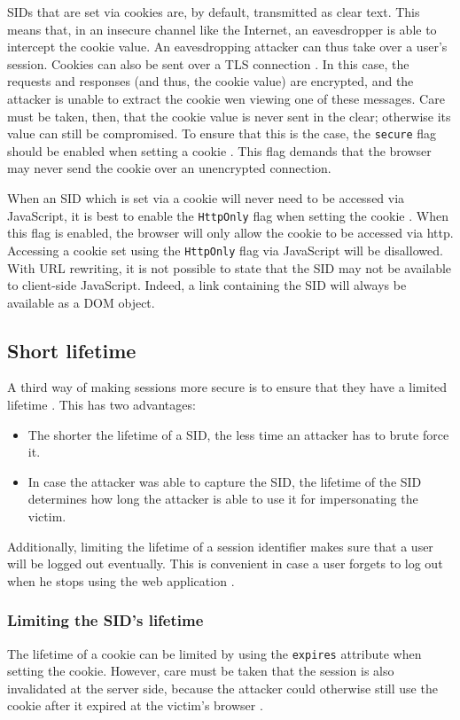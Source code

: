 \label{secure-flag}SIDs that are set via cookies are, by default, transmitted as clear text. This means that, in an insecure channel like the Internet, an eavesdropper is able to intercept the cookie value. An eavesdropping attacker can thus take over a user's session. Cookies can also be sent over a TLS connection \cite{rfc2246}. In this case, the requests and responses (and thus, the cookie value) are encrypted, and the attacker is unable to extract the cookie wen viewing one of these messages. Care must be taken, then, that the cookie value is never sent in the clear; otherwise its value can still be compromised. To ensure that this is the case, the \texttt{secure} flag should be enabled when setting a cookie \cite{Fu2001, rfc2109}. This flag demands that the browser may never send the cookie over an unencrypted connection.

When an SID which is set via a cookie will never need to be accessed via JavaScript, it is best to enable the \texttt{HttpOnly} flag when setting the cookie \cite{Nikiforakis2010}. When this flag is enabled, the browser will only allow the cookie to be accessed via \gls{http}. Accessing a cookie set using the \texttt{HttpOnly} flag via JavaScript will be disallowed. With URL rewriting, it is not possible to state that the SID may not be available to client-side JavaScript. Indeed, a link containing the SID will always be available as a DOM object.

\subsection{Short lifetime}\label{lifetime}
A third way of making sessions more secure is to ensure that they have a limited lifetime \cite{Fu2001}. This has two advantages:
\begin{itemize}
	\item The shorter the lifetime of a SID, the less time an attacker has to brute force it.
	\item In case the attacker was able to capture the SID, the lifetime of the SID determines how long the attacker is able to use it for impersonating the victim.
\end{itemize}

Additionally, limiting the lifetime of a session identifier makes sure that a user will be logged out eventually. This is convenient in case a user forgets to log out when he stops using the web application \cite{OWASP2009a}. %

\subsubsection{Limiting the SID's lifetime}\label{limiting-lifetime}
The lifetime of a cookie can be limited by using the \texttt{expires} attribute when setting the cookie. However, care must be taken that the session is also invalidated at the server side, because the attacker could otherwise still use the cookie after it expired at the victim's browser \cite{Kolsek2002}.

